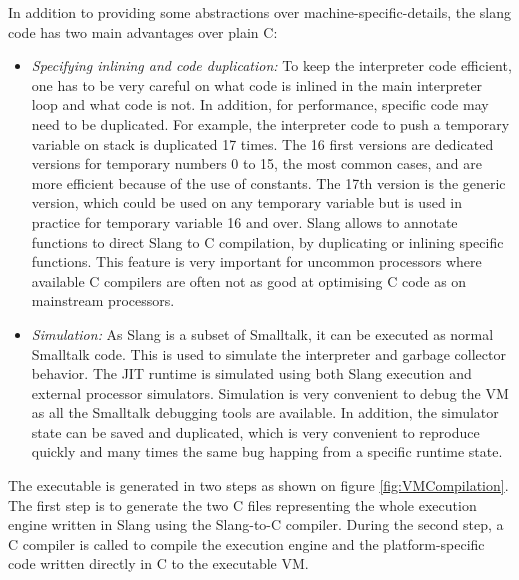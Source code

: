 \documentclass[a4paper,12pt,twoside]{../includes/ThesisStyle}
\begin{document}
In addition to providing some abstractions over machine-specific-details, the slang code has two main advantages over plain C:
\begin{itemize}
	\item \emph{Specifying inlining and code duplication:} To keep the interpreter code efficient, one has to be very careful on what code is inlined in the main interpreter loop and what code is not. In addition, for performance, specific code may need to be duplicated. For example, the interpreter code to push a temporary variable on stack is duplicated 17 times. The 16 first versions are dedicated versions for temporary numbers 0 to 15, the most common cases, and are more efficient because of the use of constants. The 17th version is the generic version, which could be used on any temporary variable but is used in practice for temporary variable 16 and over. Slang allows to annotate functions to direct Slang to C compilation, by duplicating or inlining specific functions. This feature is very important for uncommon processors where available C compilers are often not as good at optimising C code as on mainstream processors.
	\item \emph{Simulation:} As Slang is a subset of Smalltalk, it can be executed as normal Smalltalk code. This is used to simulate the interpreter and garbage collector behavior. The JIT runtime is simulated using both Slang execution and external processor simulators. Simulation is very convenient to debug the VM as all the Smalltalk debugging tools are available. In addition, the simulator state can be saved and duplicated, which is very convenient to reproduce quickly and many times the same bug happing from a specific runtime state.
\end{itemize}

The executable is generated in two steps as shown on figure \ref{fig:VMCompilation}. The first step is to generate the two C files representing the whole execution engine written in Slang using the Slang-to-C compiler. During the second step, a C compiler is called to compile the execution engine and the platform-specific code written directly in C to the executable VM.
\end{document}
